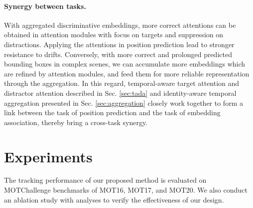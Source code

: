 \documentclass[final]{cvpr}
\begin{document}
\paragraph{Synergy between tasks.}
With aggregated discriminative embeddings, more correct attentions can be obtained in attention modules with focus on targets and suppression on distractions. Applying the attentions in position prediction lead to stronger resistance to drifts. Conversely, with more correct and prolonged predicted bounding boxes in complex scenes, we can accumulate more embeddings which are refined by attention modules, and feed them for more reliable representation through the aggregation. In this regard, temporal-aware target attention and distractor attention described in Sec. \ref{sec:tada} and identity-aware temporal aggregation presented in Sec. \ref{sec:aggregation} closely work together to form a link between the task of position prediction and the task of embedding association, thereby bring a cross-task synergy.


\section{Experiments}
The tracking performance of our proposed method is evaluated on MOTChallenge benchmarks of MOT16, MOT17, and MOT20. We also conduct an ablation study with analyses to verify the effectiveness of our design.
\end{document}
